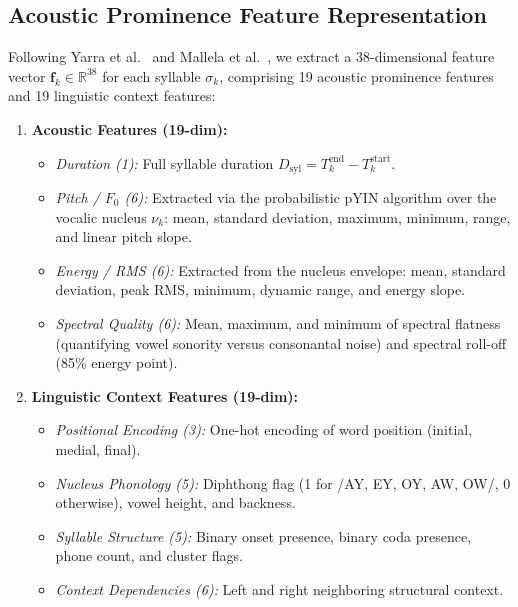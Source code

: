 \documentclass[10pt,conference]{IEEEtran}
\begin{document}
\subsection{Acoustic Prominence Feature Representation}
\label{sec:features}
Following Yarra et al.~\cite{yarra2019comparison} and Mallela et al.~\cite{mallela2024comparative}, we extract a 38-dimensional feature vector $\mathbf{f}_k \in \mathbb{R}^{38}$ for each syllable $\sigma_k$, comprising 19 acoustic prominence features and 19 linguistic context features:
\begin{enumerate}
    \item \textbf{Acoustic Features (19-dim):}
    \begin{itemize}
        \item \textit{Duration (1):} Full syllable duration $D_{\text{syl}} = T_k^{\text{end}} - T_k^{\text{start}}$.
        \item \textit{Pitch / $F_0$ (6):} Extracted via the probabilistic pYIN algorithm over the vocalic nucleus $\nu_k$: mean, standard deviation, maximum, minimum, range, and linear pitch slope.
        \item \textit{Energy / RMS (6):} Extracted from the nucleus envelope: mean, standard deviation, peak RMS, minimum, dynamic range, and energy slope.
        \item \textit{Spectral Quality (6):} Mean, maximum, and minimum of spectral flatness (quantifying vowel sonority versus consonantal noise) and spectral roll-off (85\% energy point).
    \end{itemize}
    \item \textbf{Linguistic Context Features (19-dim):}
    \begin{itemize}
        \item \textit{Positional Encoding (3):} One-hot encoding of word position (initial, medial, final).
        \item \textit{Nucleus Phonology (5):} Diphthong flag (1 for /AY, EY, OY, AW, OW/, 0 otherwise), vowel height, and backness.
        \item \textit{Syllable Structure (5):} Binary onset presence, binary coda presence, phone count, and cluster flags.
        \item \textit{Context Dependencies (6):} Left and right neighboring structural context.
    \end{itemize}
\end{enumerate}
\end{document}
